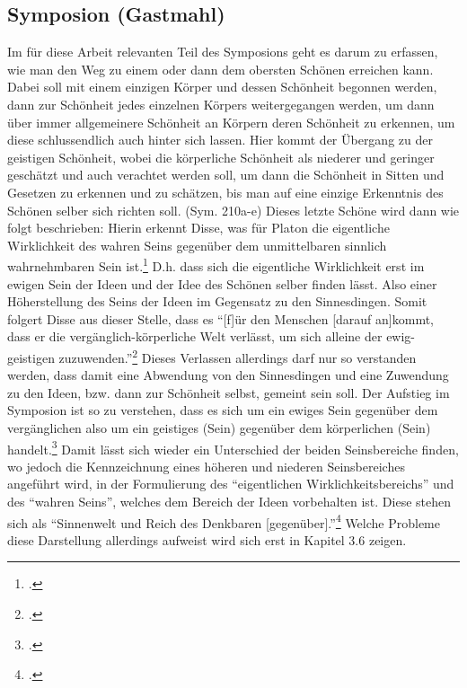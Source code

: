 \subsection{Symposion (Gastmahl)}
Im für diese Arbeit relevanten Teil des Symposions geht es darum zu erfassen, wie man den Weg zu einem oder dann dem obersten Schönen erreichen kann. Dabei soll mit einem einzigen Körper und dessen Schönheit begonnen werden, dann zur Schönheit jedes einzelnen Körpers weitergegangen werden, um dann über immer allgemeinere Schönheit an Körpern deren Schönheit zu erkennen, um diese schlussendlich auch hinter sich lassen. Hier kommt der Übergang zu der geistigen Schönheit, wobei die körperliche Schönheit als niederer und geringer geschätzt und auch verachtet werden soll, um dann die Schönheit in Sitten und Gesetzen zu erkennen und zu schätzen, bis man auf eine einzige Erkenntnis des Schönen selber sich richten soll. (Sym. 210a-e)  
Dieses letzte Schöne wird dann wie folgt beschrieben: 
Hierin erkennt Disse, was für Platon die eigentliche Wirklichkeit des wahren Seins gegenüber dem unmittelbaren sinnlich wahrnehmbaren Sein ist.\footcite[vgl.][S. 27]{DisseMetaphysik} D.h. dass sich die eigentliche Wirklichkeit erst im ewigen Sein der Ideen und der Idee des Schönen selber finden lässt. Also einer Höherstellung des Seins der Ideen im Gegensatz zu den Sinnesdingen. Somit folgert Disse aus dieser Stelle, dass es \enquote{[f]ür den Menschen [darauf an]kommt, dass er die vergänglich-körperliche Welt verlässt, um sich alleine der ewig-geistigen zuzuwenden.}\footcite[vgl.][S. 28]{DisseMetaphysik} Dieses Verlassen allerdings darf nur so verstanden werden, dass damit eine Abwendung von den Sinnesdingen und eine Zuwendung zu den Ideen, bzw. dann zur Schönheit selbst, gemeint sein soll.
Der Aufstieg im Symposion ist so zu verstehen, dass es sich um ein ewiges Sein gegenüber dem vergänglichen also um ein geistiges (Sein) gegenüber dem körperlichen (Sein) handelt.\footcite[vgl.][S. 27f.]{DisseMetaphysik}
Damit lässt sich wieder ein Unterschied der beiden Seinsbereiche finden, wo jedoch die Kennzeichnung eines höheren und niederen Seinsbereiches angeführt wird, in der Formulierung des \enquote{eigentlichen Wirklichkeitsbereichs} und des \enquote{wahren Seins}, welches dem Bereich der Ideen vorbehalten ist. Diese stehen sich als \enquote{Sinnenwelt und Reich des Denkbaren [gegenüber].}\footcite[vgl.][S. 28]{DisseMetaphysik} Welche Probleme diese Darstellung allerdings aufweist wird sich erst in Kapitel 3.6 zeigen.
